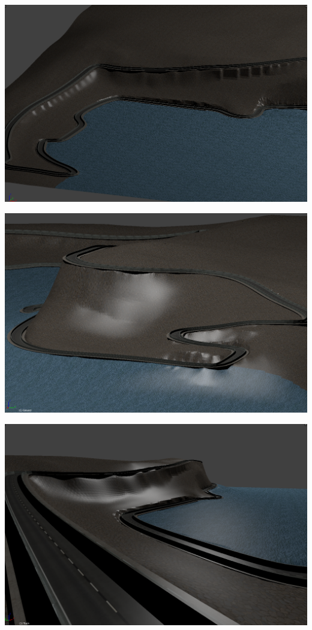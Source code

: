 \documentclass[notes,slidesec,a4]{seminar}
\begin{document}
\begin{hslide}
	\begin{minipage}{0.5\textwidth}
		\includegraphics[width=\textwidth]{MonacoElev01.png}
	\end{minipage}
	\begin{minipage}{0.5\textwidth}
		\includegraphics[width=\textwidth]{MonacoElev02.png}
	\end{minipage}
	\begin{minipage}{0.5\textwidth}
		\includegraphics[width=\textwidth]{MonacoElev03.png}

\end{minipage}
\end{hslide}
\end{document}
